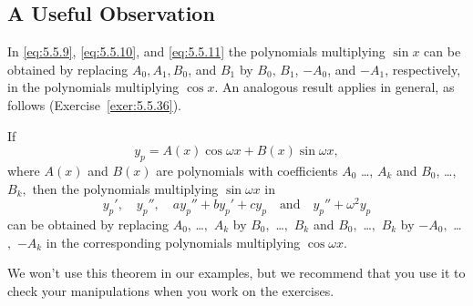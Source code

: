 \documentclass{ximera}
\begin{document}
\subsection*{A Useful Observation}

In \eqref{eq:5.5.9}, \eqref{eq:5.5.10}, and \eqref{eq:5.5.11} the polynomials
multiplying $\sin x$ can be obtained by replacing $A_0,A_1,B_0$,
and $B_1$ by $B_0$, $B_1$, $-A_0$, and $-A_1$, respectively, in the
polynomials multiplying $\cos x$. An analogous result applies in
general, as follows (Exercise~\ref{exer:5.5.36}).


\begin{theorem}\label{thmtype:5.5.2}
If
$$
y_p=A(x)\cos\omega x+B(x)\sin\omega x,
$$
where $A(x)$ and $B(x)$ are polynomials with coefficients
$A_0$ \dots, $A_k$ and $B_0$, \dots, $B_k,$ then the polynomials
multiplying $\sin\omega x$ in
$$
y_p',\quad y_p'',\quad  ay_p''+by_p'+cy_p
\quad\mbox{and}\quad y_p''+\omega^2 y_p
$$
can be obtained by replacing $A_0$, \dots$,$ $A_k$ by $B_0,$ \dots$,$ $B_k$
and $B_0,$ \dots$,$  $B_k$ by $-A_0,$ \dots$,$ $-A_k$ in the corresponding
polynomials multiplying $\cos\omega x$.
\end{theorem}

We won't use this theorem in our examples, but we recommend that
you use it to check your manipulations when you work on the  exercises.
\end{document}

